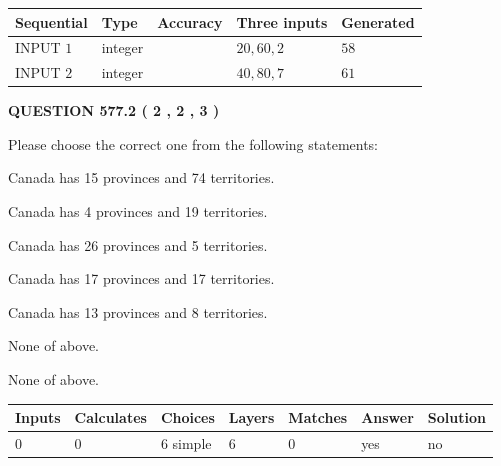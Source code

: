 \documentclass[12pt]{article}
\begin{document}
   
  
  
\noindent\begin{tabular}{|l|l|l|l|l|}
\hline
 Sequential & Type & Accuracy & Three inputs & Generated \\ 
\hline
 
 
  INPUT $  1 $ & integer &  & $
 20
 , 
 60
 , 
 2
 $ & $ 58 $ 
 \\  \hline  
 
 
  INPUT $  2 $ & integer &  & $
 40
 , 
 80
 , 
 7
 $ & $ 61 $ 
 \\  \hline  
 \end{tabular}
   
   
  
\vspace{0.2in}
  
{\textbf{\Large{QUESTION
577.2 
 ( 2 , 2 , 3 )
}}}
  
  
Please choose the correct one from the following statements:
 
 
Canada has  15 provinces and  74 territories.
 
 
Canada has   4 provinces and  19 territories.
 
 
Canada has  26 provinces and  5 territories.
 
 
Canada has  17 provinces and  17 territories.
 
 
Canada has  13 provinces and  8 territories.
 
 
 None of above.
 
 
\noindent{}
 
 
 None of above.
 
 
\noindent{}
 
 
   
   
   
   
\noindent\begin{tabular}{|l|l|l|l|l|l|l|}
 \hline
Inputs & Calculates & Choices & Layers & Matches & Answer & Solution \\ \hline
 0  & 
 0  & 
 6
  simple  
  & 
 6  & 
 0  & 
  yes & 
  no 
  \\ \hline
 \end{tabular}
   
\end{document}
